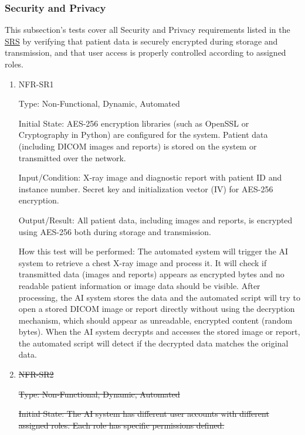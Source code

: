 \documentclass[12pt, titlepage]{article}
\begin{document}
\subsubsection{Security and Privacy}

This subsection's tests cover all Security and Privacy requirements listed in the \href{https://github.com/RezaJodeiri/CXR-Capstone/blob/main/docs/SRS/SRS.pdf}{SRS} \citep{SRS}
 by verifying that patient data is securely encrypted during storage and transmission, and that user access is properly controlled according to assigned roles.

\begin{enumerate}

\item{NFR-SR1\\}\label{NFR-SR1}

Type: Non-Functional, Dynamic, Automated

Initial State: AES-256 encryption libraries (such as OpenSSL or Cryptography in Python) are configured for the system. Patient data (including DICOM images and reports) is stored on the system or transmitted over the network.

Input/Condition: X-ray image and diagnostic report with patient ID and instance number. Secret key and initialization vector (IV) for AES-256 encryption.

Output/Result: All patient data, including images and reports, is encrypted using AES-256 both during storage and transmission.

How this test will be performed: The automated system will trigger the AI system to retrieve a chest X-ray image and process it. It will check if transmitted data (images and reports) appears as encrypted bytes and no readable patient information or image data should be visible. After processing, the AI system stores the data and the automated script will try to open a stored DICOM image or report directly without using the decryption mechanism, which should appear as unreadable, encrypted content (random bytes). When the AI system decrypts and accesses the stored image or report, the automated script will detect if the decrypted data matches the original data.

\item{\sout{NFR-SR2}\\}\label{NFR-SR2}

\sout{Type: Non-Functional, Dynamic, Automated}

\sout{Initial State: The AI system has different user accounts with different assigned roles. Each role has specific permissions defined.}


\end{enumerate}
\end{document}
